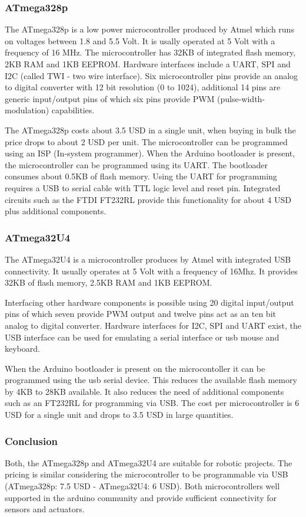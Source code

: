 \documentclass[11pt,a4paper]{article}
\begin{document}
\subsubsection{ATmega328p}
The ATmega328p is a low power microcontroller produced by Atmel which runs on voltages between 1.8 and 5.5 Volt. It is usally operated at 5 Volt with a frequency of 16 MHz. The microcontroller has 32KB of integrated flash memory, 2KB RAM and 1KB EEPROM. Hardware interfaces include a UART, SPI and I2C (called TWI - two wire interface). Six microcontroller pins provide an analog to digital converter with 12 bit resolution (0 to 1024), additional 14 pins are generic input/output pins of which six pins provide PWM (pulse-width-modulation) capabilities.

The ATmega328p costs about 3.5 USD in a single unit, when buying in bulk the price drops to about 2 USD per unit. The microcontroller can be programmed using an ISP (In-system programmer). When the Arduino bootloader is present, the microcontroller can be programmed using its UART. The bootloader consumes about 0.5KB of flash memory. Using the UART for programming requires a USB to serial cable with TTL logic level and reset pin. Integrated circuits such as the FTDI  FT232RL provide this functionality for about 4 USD plus additional components.
\subsubsection{ATmega32U4}
The ATmega32U4 is a microcontroller produces by Atmel with integrated USB connectivity. It usually operates at 5 Volt with a frequency of 16Mhz. It provides 32KB of flash memory, 2.5KB RAM and 1KB EEPROM. 

Interfacing other hardware components is possible using 20 digital input/output pins of which seven provide PWM output and twelve pins act as an ten bit analog to digital converter. Hardware interfaces for I2C, SPI and UART exist, the USB interface can be used for emulating a serial interface or usb mouse and keyboard.

When the Arduino bootloader is present on the microcontoller it can be programmed using the usb serial device. This reduces the available flash memory by 4KB to 28KB available. It also reduces the need of additional components such as an FT232RL for programming via USB.
The cost per microcontroller is 6 USD for a single unit and drops to 3.5 USD in large quantities.
\subsubsection{Conclusion}
Both, the ATmega328p and ATmega32U4 are suitable for robotic projects. The pricing is similar considering the microcontroller to be programmable via USB (ATmega328p: 7.5 USD - ATmega32U4: 6 USD). Both microcontrollers well supported in the arduino community and provide sufficient connectivity for sensors and actuators.  
\end{document}
